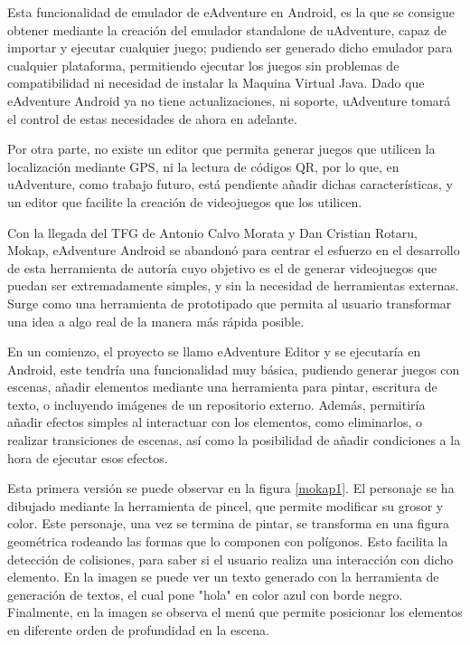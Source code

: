 Esta funcionalidad de emulador de eAdventure en Android, es la que se consigue obtener mediante la creación del emulador standalone de uAdventure, capaz de importar y ejecutar cualquier juego; pudiendo ser generado dicho emulador para cualquier plataforma, permitiendo ejecutar los juegos sin problemas de compatibilidad ni necesidad de instalar la Maquina Virtual Java. Dado que eAdventure Android ya no tiene actualizaciones, ni soporte, uAdventure tomará el control de estas necesidades de ahora en adelante.

Por otra parte, no existe un editor que permita generar juegos que utilicen la localización mediante GPS, ni la lectura de códigos QR, por lo que, en uAdventure, como trabajo futuro, está pendiente añadir dichas características, y un editor que facilite la creación de videojuegos que los utilicen. 

Con la llegada del TFG de Antonio Calvo Morata y Dan Cristian Rotaru, Mokap, eAdventure Android se abandonó para centrar el esfuerzo en el desarrollo de esta herramienta de autoría cuyo objetivo es el de generar videojuegos que puedan ser extremadamente simples, y sin la necesidad de herramientas externas. Surge como una herramienta de prototipado que permita al usuario transformar una idea a algo real de la manera más rápida posible.

En un comienzo, el proyecto se llamo eAdventure Editor y se ejecutaría en Android, este tendría una funcionalidad muy básica, pudiendo generar juegos con escenas, añadir elementos mediante una herramienta para pintar, escritura de texto, o incluyendo imágenes de un repositorio externo. Además, permitiría añadir efectos simples al interactuar con los elementos, como eliminarlos, o realizar transiciones de escenas, así como la posibilidad de añadir condiciones a la hora de ejecutar esos efectos.

Esta primera versión se puede observar en la figura \ref{mokap1}. El personaje se ha dibujado mediante la herramienta de pincel, que permite modificar su grosor y color. Este personaje, una vez se termina de pintar, se transforma en una figura geométrica rodeando las formas que lo componen con polígonos. Esto facilita la detección de colisiones, para saber si el usuario realiza una interacción con dicho elemento. En la imagen se puede ver un texto generado con la herramienta de generación de textos, el cual pone "hola" en color azul con borde negro. Finalmente, en la imagen se observa el menú que permite posicionar los elementos en diferente orden de profundidad en la escena.

